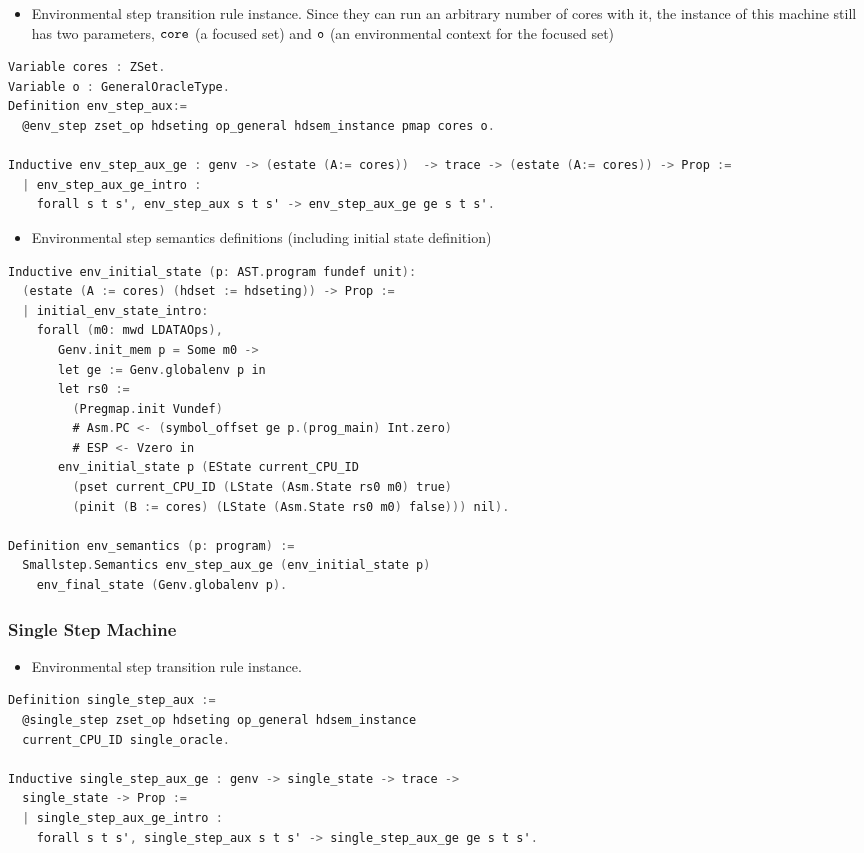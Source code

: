 \begin{itemize}[leftmargin=*]
\item Environmental step transition rule instance. Since they can run an arbitrary number of cores with it, 
the instance of this machine still has two parameters, ${\mathrm{\texttt{core}}}$ (a focused set) and ${\mathrm{\texttt{o}}}$ (an environmental context for 
the focused set)
\end{itemize}
\begin{lstlisting}[language=C]
Variable cores : ZSet.
Variable o : GeneralOracleType.
Definition env_step_aux:=
  @env_step zset_op hdseting op_general hdsem_instance pmap cores o.

Inductive env_step_aux_ge : genv -> (estate (A:= cores))  -> trace -> (estate (A:= cores)) -> Prop :=
  | env_step_aux_ge_intro : 
    forall s t s', env_step_aux s t s' -> env_step_aux_ge ge s t s'.
\end{lstlisting}

\begin{itemize}[leftmargin=*]
\item Environmental step  semantics definitions (including initial state definition)
\end{itemize}
\begin{lstlisting}[language=C]
Inductive env_initial_state (p: AST.program fundef unit): 
  (estate (A := cores) (hdset := hdseting)) -> Prop :=
  | initial_env_state_intro: 
    forall (m0: mwd LDATAOps),
       Genv.init_mem p = Some m0 ->
       let ge := Genv.globalenv p in
       let rs0 :=
         (Pregmap.init Vundef)
         # Asm.PC <- (symbol_offset ge p.(prog_main) Int.zero)
         # ESP <- Vzero in
       env_initial_state p (EState current_CPU_ID 
         (pset current_CPU_ID (LState (Asm.State rs0 m0) true)
         (pinit (B := cores) (LState (Asm.State rs0 m0) false))) nil).

Definition env_semantics (p: program) :=
  Smallstep.Semantics env_step_aux_ge (env_initial_state p) 
    env_final_state (Genv.globalenv p).    
\end{lstlisting}

\subsubsection{Single Step Machine}    
\begin{itemize}[leftmargin=*]
\item Environmental step transition rule instance.
\end{itemize}
\begin{lstlisting}[language=C]
Definition single_step_aux :=
  @single_step zset_op hdseting op_general hdsem_instance 
  current_CPU_ID single_oracle.

Inductive single_step_aux_ge : genv -> single_state -> trace -> 
  single_state -> Prop :=
  | single_step_aux_ge_intro : 
    forall s t s', single_step_aux s t s' -> single_step_aux_ge ge s t s'.
\end{lstlisting}


